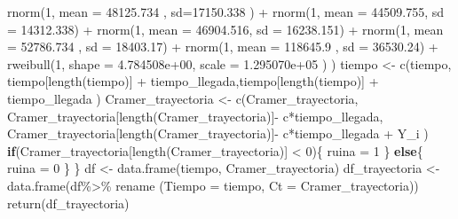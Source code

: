 \documentclass[
  us-letterpaper,
]{scrreprt}
\newenvironment{Shaded}{\begin{snugshade}}{\end{snugshade}}
\newcommand{\AttributeTok}[1]{\textcolor[rgb]{0.40,0.45,0.13}{#1}}
\newcommand{\ControlFlowTok}[1]{\textcolor[rgb]{0.00,0.23,0.31}{\textbf{#1}}}
\newcommand{\DecValTok}[1]{\textcolor[rgb]{0.68,0.00,0.00}{#1}}
\newcommand{\FloatTok}[1]{\textcolor[rgb]{0.68,0.00,0.00}{#1}}
\newcommand{\FunctionTok}[1]{\textcolor[rgb]{0.28,0.35,0.67}{#1}}
\newcommand{\NormalTok}[1]{\textcolor[rgb]{0.00,0.23,0.31}{#1}}
\newcommand{\OtherTok}[1]{\textcolor[rgb]{0.00,0.23,0.31}{#1}}
\newcommand{\SpecialCharTok}[1]{\textcolor[rgb]{0.37,0.37,0.37}{#1}}
\theoremstyle{plain}
\theoremstyle{plain}
\theoremstyle{definition}
\theoremstyle{remark}
\begin{document}
\begin{Shaded}
\begin{Highlighting}[]
            \FunctionTok{rnorm}\NormalTok{(}\DecValTok{1}\NormalTok{, }\AttributeTok{mean =} \FloatTok{48125.734}\NormalTok{ , }\AttributeTok{sd=}\FloatTok{17150.338}\NormalTok{ )   }\SpecialCharTok{+}  
            \FunctionTok{rnorm}\NormalTok{(}\DecValTok{1}\NormalTok{, }\AttributeTok{mean =}  \FloatTok{44509.755}\NormalTok{, }\AttributeTok{sd =} \FloatTok{14312.338}\NormalTok{)  }\SpecialCharTok{+} 
            \FunctionTok{rnorm}\NormalTok{(}\DecValTok{1}\NormalTok{, }\AttributeTok{mean =}   \FloatTok{46904.516}\NormalTok{, }\AttributeTok{sd =} \FloatTok{16238.151}\NormalTok{) }\SpecialCharTok{+} 
            \FunctionTok{rnorm}\NormalTok{(}\DecValTok{1}\NormalTok{, }\AttributeTok{mean =} \FloatTok{52786.734}\NormalTok{  , }\AttributeTok{sd =} \FloatTok{18403.17}\NormalTok{)  }\SpecialCharTok{+} 
            \FunctionTok{rnorm}\NormalTok{(}\DecValTok{1}\NormalTok{, }\AttributeTok{mean =} \FloatTok{118645.9}\NormalTok{  , }\AttributeTok{sd =} \FloatTok{36530.24}\NormalTok{)   }\SpecialCharTok{+} 
    \FunctionTok{rweibull}\NormalTok{(}\DecValTok{1}\NormalTok{,  }\AttributeTok{shape =} \FloatTok{4.784508e+00}\NormalTok{, }\AttributeTok{scale =} \FloatTok{1.295070e+05}\NormalTok{ ) ) }
\NormalTok{    tiempo }\OtherTok{\textless{}{-}} \FunctionTok{c}\NormalTok{(tiempo, tiempo[}\FunctionTok{length}\NormalTok{(tiempo)] }\SpecialCharTok{+}
\NormalTok{                  tiempo\_llegada,tiempo[}\FunctionTok{length}\NormalTok{(tiempo)] }\SpecialCharTok{+}
\NormalTok{                  tiempo\_llegada ) }
\NormalTok{    Cramer\_trayectoria }\OtherTok{\textless{}{-}} \FunctionTok{c}\NormalTok{(Cramer\_trayectoria,}
\NormalTok{           Cramer\_trayectoria[}\FunctionTok{length}\NormalTok{(Cramer\_trayectoria)]}\SpecialCharTok{{-}} 
\NormalTok{                              c}\SpecialCharTok{*}\NormalTok{tiempo\_llegada,}
\NormalTok{          Cramer\_trayectoria[}\FunctionTok{length}\NormalTok{(Cramer\_trayectoria)]}\SpecialCharTok{{-}}
\NormalTok{                              c}\SpecialCharTok{*}\NormalTok{tiempo\_llegada }\SpecialCharTok{+}\NormalTok{  Y\_i )}
    \ControlFlowTok{if}\NormalTok{(Cramer\_trayectoria[}\FunctionTok{length}\NormalTok{(Cramer\_trayectoria)] }\SpecialCharTok{\textless{}} \DecValTok{0}\NormalTok{)\{}
\NormalTok{      ruina }\OtherTok{=} \DecValTok{1}
\NormalTok{    \}}
    \ControlFlowTok{else}\NormalTok{\{}
\NormalTok{      ruina }\OtherTok{=} \DecValTok{0}
\NormalTok{    \}}
\NormalTok{  \}}
\NormalTok{  df }\OtherTok{\textless{}{-}} \FunctionTok{data.frame}\NormalTok{(tiempo, Cramer\_trayectoria)}
\NormalTok{  df\_trayectoria }\OtherTok{\textless{}{-}} \FunctionTok{data.frame}\NormalTok{(df}\SpecialCharTok{\%\textgreater{}\%}\NormalTok{ rename}
\NormalTok{                               (}\AttributeTok{Tiempo =}\NormalTok{ tiempo, }
                                 \AttributeTok{Ct =}\NormalTok{ Cramer\_trayectoria))}
  \FunctionTok{return}\NormalTok{(df\_trayectoria)}
  

\end{Highlighting}
\end{Shaded}
\end{document}
